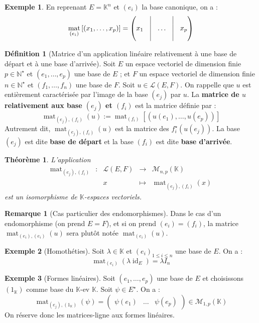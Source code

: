 \documentclass[french]{book}
\newcommand{\N}{\mathbb{N}}
\newcommand{\K}{\mathbb{K}}
\newcommand{\st}{^\star}
\theoremstyle{plain}
\newtheorem{thm}{Théorème}[chapter]
\theoremstyle{definition}
\newtheorem{dfn}{Définition}[chapter]
\newtheorem{exa}{Exemple}[chapter]
\newtheorem{rmq}{Remarque}[chapter]
\theoremstyle{remark}
\DeclareMathOperator{\id}{id}
\DeclareMathOperator{\mat}{mat}
\begin{document}
\begin{exa}
	En reprenant $E=\K^n$ et $(e_i)$ la base canonique, on a : $$\mat_{(e_i)}\left[(x_1,\ldots,x_p)\right]=\begin{pmatrix}&\vline&&\vline&\\x_1&\vline&\ldots&\vline&x_p\\&\vline&&\vline&\end{pmatrix}$$
\end{exa}
\begin{dfn}[Matrice d'un application linéaire relativement à une base de départ et à une base d'arrivée]
	Soit $E$ un espace vectoriel de dimension finie $p\in\N\st$ et $(e_1,\ldots,e_p)$ une base de $E$ ; et $F$ un espace vectoriel de dimension finie $n\in\N\st$ et $(f_1,\ldots,f_n)$ une base de $F$. Soit $u\in\mathcal{L}(E,F)$. On rappelle que $u$ est entièrement caractérisée par l'image de la base $(e_j)$ par $u$. La \textbf{matrice de $u$ relativement aux base $(e_j)$ et $(f_i)$} est la matrice définie par : $$\mat_{(e_j),(f_i)}(u):=\mat_{(f_i)}\left[(u(e_1),\ldots,u(e_p))\right]$$ Autrement dit, $\mat_{(e_j),(f_i)}(u)$ est la matrice des $f_i\st(u(e_j))$. La base $(e_j)$ est dite \textbf{base de départ} et la base $(f_i)$ est dite \textbf{base d'arrivée}.
\end{dfn}
\begin{thm}
	L'application $$\begin{array}{ccccc}\mat_{(e_j),(f_i)}&:&\mathcal{L}(E,F)&\rightarrow&\mathcal{M}_{n,p}(\K)\\&&x&\mapsto&\mat_{(e_j),(f_i)}(x)\end{array}$$ est un isomorphisme de $\K$-espaces vectoriels.
\end{thm}
\begin{rmq}[Cas particulier des endomorphismes]
	Dans le cas d'un endomorphisme (on prend $E=F$), et si on prend $(e_i)=(f_i)$, la matrice $\mat_{(e_i),(e_i)}(u)$ sera plutôt notée $\mat_{(e_i)}(u)$.
\end{rmq}
\begin{exa}[Homothéties]
	Soit $\lambda\in\K$ et $(e_i)_{1\leqslant i\leqslant n}$ une base de $E$. On a : $$\mat_{(e_i)}(\lambda\id_E)=\lambda I_n$$
\end{exa}
\begin{exa}[Formes linéaires]
	Soit $(e_1,\ldots,e_p)$ une base de $E$ et choisissons $(1_\K)$ comme base du $\K$-ev $\K$. Soit $\psi\in E\st$. On a : $$\mat_{(e_j),(1_\K)}(\psi)=\begin{pmatrix}\psi(e_1)&\ldots&\psi(e_p)\end{pmatrix}\in\mathcal{M}_{1,p}(\K)$$ On réserve donc les matrices-ligne aux formes linéaires.
\end{exa}
\end{document}
